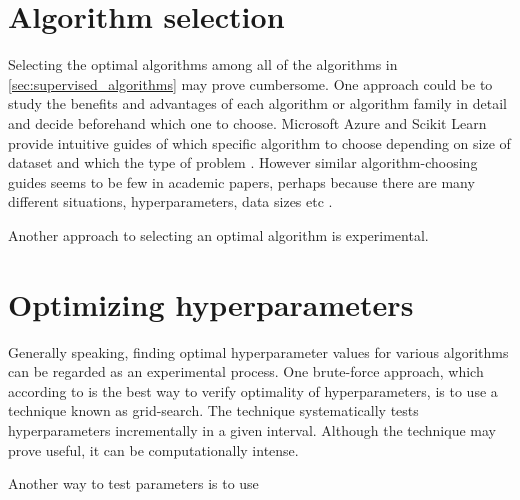 \section{Algorithm selection}
	Selecting the optimal algorithms among all of the algorithms in \ref{sec:supervised_algorithms} may prove cumbersome. One approach could be to study the benefits and advantages of each algorithm or algorithm family in detail and decide beforehand which one to choose. Microsoft Azure and Scikit Learn provide intuitive guides of which specific algorithm to choose depending on size of dataset and which the type of problem \cite{WEBSITE:20, WEBSITE:21}. However similar algorithm-choosing guides seems to be few in academic papers, perhaps because there are many different situations, hyperparameters, data sizes etc .

	Another approach to selecting an optimal algorithm is experimental.

\section{Optimizing hyperparameters} \label{sec:hyperparameters}
	Generally speaking, finding optimal hyperparameter values for various algorithms can be regarded as an experimental process. One brute-force approach, which according to \cite{BOOK:9} is the best way to verify optimality of hyperparameters, is to use a technique known as grid-search. The technique systematically tests hyperparameters incrementally in a given interval. Although the technique may prove useful, it can be computationally intense.

	Another way to test parameters is to use








